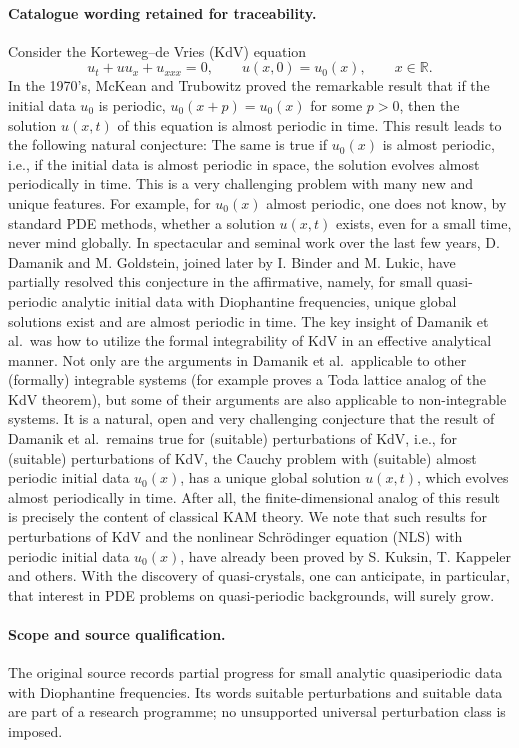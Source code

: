 \documentclass[11pt]{article}
\begin{document}
\paragraph{Catalogue wording retained for traceability.}
Consider the Korteweg--de Vries (KdV) equation \[u_t+uu_x+u_{xxx}=0,\qquad u(x,0)=u_0(x),\qquad x\in\mathbb R.\] In the 1970's, McKean and Trubowitz proved the remarkable result that if the initial data $u_0$ is periodic, $u_0(x+p)= u_0(x)$ for some $p>0$, then the solution $u(x,t)$ of this equation is almost periodic in time. This result leads to the following natural conjecture: The same is true if $u_0(x)$ is almost periodic, i.e., if the initial data is almost periodic in space, the solution evolves almost periodically in time. This is a very challenging problem with many new and unique features. For example, for $u_0(x)$ almost periodic, one does not know, by standard PDE methods, whether a solution $u(x,t)$ exists, even for a small time, never mind globally. In spectacular and seminal work over the last few years, D. Damanik and M. Goldstein, joined later by I. Binder and M. Lukic, have partially resolved this conjecture in the affirmative, namely, for small quasi-periodic analytic initial data with Diophantine frequencies, unique global solutions exist and are almost periodic in time. The key insight of Damanik et al.\ was how to utilize the formal integrability of KdV in an effective analytical manner. Not only are the arguments in Damanik et al.\ applicable to other (formally) integrable systems (for example proves a Toda lattice analog of the KdV theorem), but some of their arguments are also applicable to non-integrable systems. It is a natural, open and very challenging conjecture that the result of Damanik et al.\ remains true for (suitable) perturbations of KdV, i.e., for (suitable) perturbations of KdV, the Cauchy problem with (suitable) almost periodic initial data $u_0(x)$, has a unique global solution $u(x,t)$, which evolves almost periodically in time. After all, the finite-dimensional analog of this result is precisely the content of classical KAM theory. We note that such results for perturbations of KdV and the nonlinear Schr\"{o}dinger equation (NLS) with periodic initial data $u_0(x)$, have already been proved by S. Kuksin, T. Kappeler and others. With the discovery of quasi-crystals, one can anticipate, in particular, that interest in PDE problems on quasi-periodic backgrounds, will surely grow.
\paragraph{Scope and source qualification.}The original source records partial progress for small analytic quasiperiodic data with Diophantine frequencies. Its words suitable perturbations and suitable data are part of a research programme; no unsupported universal perturbation class is imposed.
\end{document}
